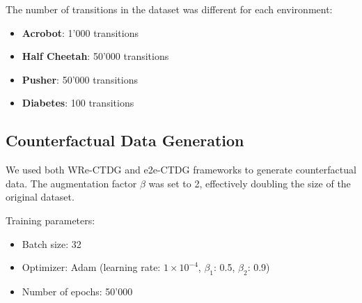 The number of transitions in the dataset was different for each environment:
\begin{itemize}
    \item \textbf{Acrobot}: 1'000 transitions
    \item \textbf{Half Cheetah}: 50'000 transitions
    \item \textbf{Pusher}: 50'000 transitions
    \item \textbf{Diabetes}: 100 transitions
\end{itemize}

\subsection{Counterfactual Data Generation}

We used both WRe-CTDG and e2e-CTDG frameworks to generate counterfactual data. The augmentation factor $\beta$ was set to 2, effectively doubling the size of the original dataset.

Training parameters:
\begin{itemize}
    \item Batch size: 32
    \item Optimizer: Adam (learning rate: $1\times 10^{-4}$, $\beta_1$: 0.5, $\beta_2$: 0.9)
    \item Number of epochs: 50'000
\end{itemize}

